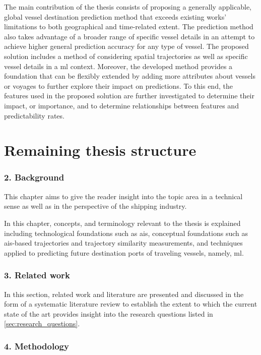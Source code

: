 The main contribution of the thesis consists of proposing a generally applicable, global vessel destination prediction method that exceeds existing works' limitations to both geographical and time-related extent. The prediction method also takes advantage of a broader range of specific vessel details in an attempt to achieve higher general prediction accuracy for any type of vessel. The proposed solution includes a method of considering spatial trajectories as well as specific vessel details in a \acrfull{ml} context. Moreover, the developed method provides a foundation that can be flexibly extended by adding more attributes about vessels or voyages to further explore their impact on predictions. To this end, the features used in the proposed solution are further investigated to determine their impact, or importance, and to determine relationships between features and predictability rates.

\section{Remaining thesis structure}

\subsubsection{2. Background}

This chapter aims to give the reader insight into the topic area in a technical sense as well as in the perspective of the shipping industry.

In this chapter, concepts, and terminology relevant to the thesis is explained including technological foundations such as \acrfull{ais}, conceptual foundations such as \acrshort{ais}-based trajectories and trajectory similarity measurements, and techniques applied to predicting future destination ports of traveling vessels, namely, \acrfull{ml}.

\subsubsection{3. Related work}

In this section, related work and literature are presented and discussed in the form of a systematic literature review to establish the extent to which the current state of the art provides insight into the research questions listed in \cref{sec:research_questions}.

\subsubsection{4. Methodology}


